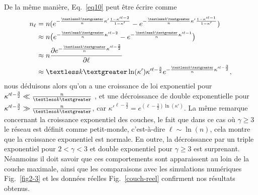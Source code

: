 De la même manière, Eq.~\eqref{eq10} peut être écrire comme
\begin{align}
n_{\ell}&= n(e^{-\frac{\textless k \textgreater}{n}\kappa'\frac{1-\kappa'^{\ell-2}}{1-\kappa'}}-e^{-\frac{\km}{n}\kappa'\frac{1-\kappa'^{\ell-1}}{1-\kappa'}})\nonumber\\
&\approx n\big(e^{-\frac{\km}{n}\kappa'^{\ell-2}}-e^{-\frac{\km}{n}\kappa'^{\ell-1}}\big)\nonumber\\
&\approx n\frac{\partial e^{-\frac{\km}{n}\kappa'^{\ell-\frac{3}{2}}}}{\partial \ell}\nonumber\\
&\approx\km\ln(\kappa')\kappa'^{\ell-\frac{3}{2}}e^{-\frac{\km}{n}\kappa'^{\ell-\frac{3}{2}}},
\end{align}
nous déduisons alors qu'on a une croissance de loi exponentiel pour $\kappa'^{\ell-\frac{3}{2}} \ll \frac{n}{\km}$ , et une décroissance de double exponentielle pour $\kappa'^{\ell-\frac{3}{2}} \gg \frac{n}{\km}$, car $\kappa'^{\ell-\frac{3}{2}}=e^{(\ell-\frac{3}{2})\ln(\kappa')}$. La même remarque  concernant la croissance exponentiel des couches, le fait que dans ce cas où $\gamma\geq3$ le réseau est définit comme petit-monde, c'est-à-dire $\ell\sim\ln(n)$, cela montre que la croissance exponentiel est normale. 
En outre, la décroissance par un triple exponentiel pour $2<\gamma<3$ et double exponentiel pour $\gamma\geqslant3$ est surprenant. Néanmoins il doit savoir que ces comportements sont apparaissent au loin de la couche maximale, ainsi que les comparaisons avec les simulations numériques Fig.~\ref{fig2-3}  et les données réelles Fig.~\ref{couch-reel} confirment nos résultats obtenus.

